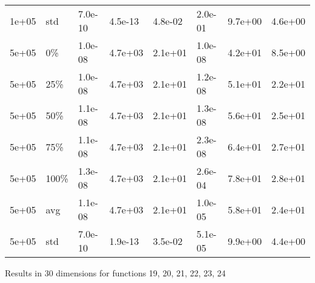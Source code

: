 \begin{longtable}{llllllll}
  1e+05 & std & 7.0e-10 & 4.5e-13 & 4.8e-02 & 2.0e-01 & 9.7e+00 & 4.6e+00 \\ 
  5e+05 & 0\% & 1.0e-08 & 4.7e+03 & 2.1e+01 & 1.0e-08 & 4.2e+01 & 8.5e+00 \\ 
  5e+05 & 25\% & 1.0e-08 & 4.7e+03 & 2.1e+01 & 1.2e-08 & 5.1e+01 & 2.2e+01 \\ 
  5e+05 & 50\% & 1.1e-08 & 4.7e+03 & 2.1e+01 & 1.3e-08 & 5.6e+01 & 2.5e+01 \\ 
  5e+05 & 75\% & 1.1e-08 & 4.7e+03 & 2.1e+01 & 2.3e-08 & 6.4e+01 & 2.7e+01 \\ 
  5e+05 & 100\% & 1.3e-08 & 4.7e+03 & 2.1e+01 & 2.6e-04 & 7.8e+01 & 2.8e+01 \\ 
  5e+05 & avg & 1.1e-08 & 4.7e+03 & 2.1e+01 & 1.0e-05 & 5.8e+01 & 2.4e+01 \\ 
  5e+05 & std & 7.0e-10 & 1.9e-13 & 3.5e-02 & 5.1e-05 & 9.9e+00 & 4.4e+00 \\ 
   \hline
\hline
\end{longtable}
\newpage
Results in 30 dimensions for functions 19, 20, 21, 22, 23, 24
